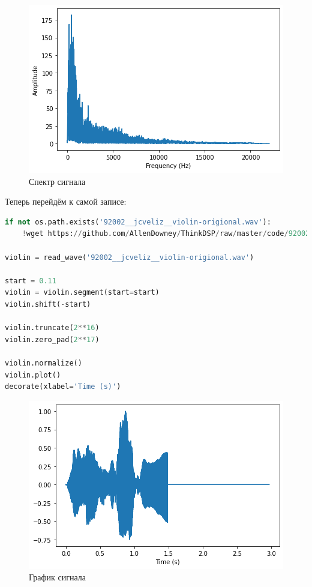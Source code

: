 \begin{figure}[H]
	\begin{center}
		\includegraphics[scale=1]{fig/lab10/lab10_02.png}
		\caption{Спектр сигнала}
	\end{center}
\end{figure}

Теперь перейдём к самой записе:

\begin{lstlisting}[language=Python]
if not os.path.exists('92002__jcveliz__violin-origional.wav'):
    !wget https://github.com/AllenDowney/ThinkDSP/raw/master/code/92002__jcveliz__violin-origional.wav
    
violin = read_wave('92002__jcveliz__violin-origional.wav')

start = 0.11
violin = violin.segment(start=start)
violin.shift(-start)

violin.truncate(2**16)
violin.zero_pad(2**17)

violin.normalize()
violin.plot()
decorate(xlabel='Time (s)')
\end{lstlisting}

\begin{figure}[H]
	\begin{center}
		\includegraphics[scale=1]{fig/lab10/lab10_03.png}
		\caption{График сигнала}
	\end{center}
\end{figure}


